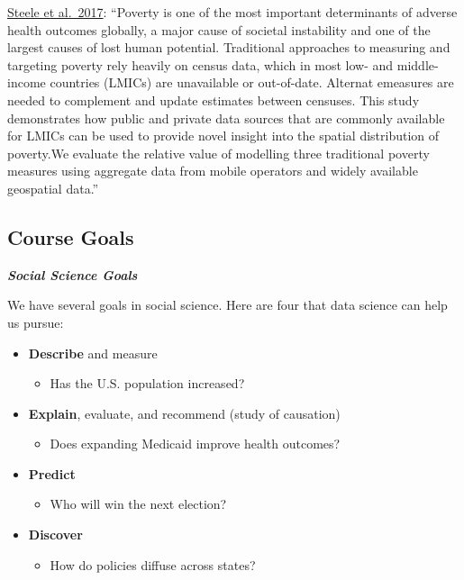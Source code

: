 \documentclass[
  letterpaper,
  DIV=11,
  numbers=noendperiod]{scrreprt}
\providecommand{\tightlist}{%
  \setlength{\itemsep}{0pt}\setlength{\parskip}{0pt}}\usepackage{longtable,booktabs,array}
\begin{document}
\href{https://royalsocietypublishing.org/doi/10.1098/rsif.2016.0690}{Steele
et al.~2017}: ``Poverty is one of the most important determinants of
adverse health outcomes globally, a major cause of societal instability
and one of the largest causes of lost human potential. Traditional
approaches to measuring and targeting poverty rely heavily on census
data, which in most low- and middle-income countries (LMICs) are
unavailable or out-of-date. Alternat emeasures are needed to complement
and update estimates between censuses. This study demonstrates how
public and private data sources that are commonly available for LMICs
can be used to provide novel insight into the spatial distribution of
poverty.We evaluate the relative value of modelling three traditional
poverty measures using aggregate data from mobile operators and widely
available geospatial data.''

\hypertarget{course-goals}{%
\subsection{Course Goals}\label{course-goals}}

\textbf{\emph{Social Science Goals}}

We have several goals in social science. Here are four that data science
can help us pursue:

\begin{itemize}
\tightlist
\item
  \textbf{Describe} and measure

  \begin{itemize}
  \tightlist
  \item
    Has the U.S. population increased?
  \end{itemize}
\item
  \textbf{Explain}, evaluate, and recommend (study of causation)

  \begin{itemize}
  \tightlist
  \item
    Does expanding Medicaid improve health outcomes?
  \end{itemize}
\item
  \textbf{Predict}

  \begin{itemize}
  \tightlist
  \item
    Who will win the next election?
  \end{itemize}
\item
  \textbf{Discover}

  \begin{itemize}
  \tightlist
  \item
    How do policies diffuse across states?
  \end{itemize}
\end{itemize}
\end{document}

